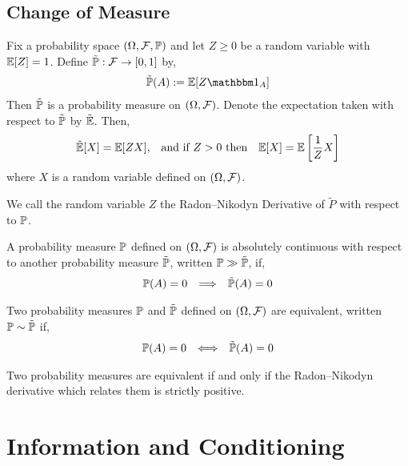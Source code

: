 \documentclass[12pt]{article}
\begin{document}
\subsection{Change of Measure}
\begin{theorem}
Fix a probability space \( (\Omega,\mathcal{F},\mathbb{P}) \) and let \( Z\geq 0 \) be a random variable with \( \mathbb{E}[Z] = 1 \). Define \( \tilde{\mathbb{P}}: \mathcal{F} \to [0,1] \) by,
\begin{align*}
    \tilde{\PP}(A) := \EE[Z\bOne_A]
\end{align*}
Then \( \tilde{\mathbb{P}} \) is a probability measure on \( (\Omega,\mathcal{F}) \). Denote the expectation taken with respect to \( \tilde{\mathbb{P}} \) by \( \tilde{\mathbb{E}} \). Then,
\begin{align*}
    \tilde{\mathbb{E}}[X] = \mathbb{E}[ZX], && \text{and if } Z>0 \text{ then} &&
    \mathbb{E}[X] = \mathbb{E} \left[ \frac{1}{Z}X \right]
\end{align*}
where \( X \) is a random variable defined on \( (\Omega,\mathcal{F}) \).
\end{theorem}

\begin{definition}
We call the random variable \( Z \) the Radon--Nikodyn Derivative of \( \tilde{P} \) with respect to \( \mathbb{P} \).
\end{definition}

\begin{definition}
A probability measure \( \mathbb{P} \) defined on \( (\Omega,\mathcal{F}) \) is absolutely continuous with respect to another probability measure \( \tilde{\mathbb{P}} \), written \( \mathbb{P} \gg \tilde{\mathbb{P}} \), if,
\begin{align*}
    \mathbb{P}(A) = 0 && \Longrightarrow && \tilde{\mathbb{P}}(A) = 0
\end{align*}
\end{definition}

\begin{definition}[Equivalent]
Two probability measures \( \mathbb{P} \) and \( \tilde{\mathbb{P}} \) defined on \( (\Omega,\mathcal{F}) \) are equivalent, written \( \mathbb{P}\sim\tilde{\mathbb{P}} \) if,
\begin{align*}
    \mathbb{P}(A) = 0 && \Longleftrightarrow && \tilde{\mathbb{P}}(A) = 0
\end{align*}
\end{definition}

Two probability measures are equivalent if and only if the Radon--Nikodyn derivative which relates them is strictly positive.

\section{Information and Conditioning}
\end{document}

